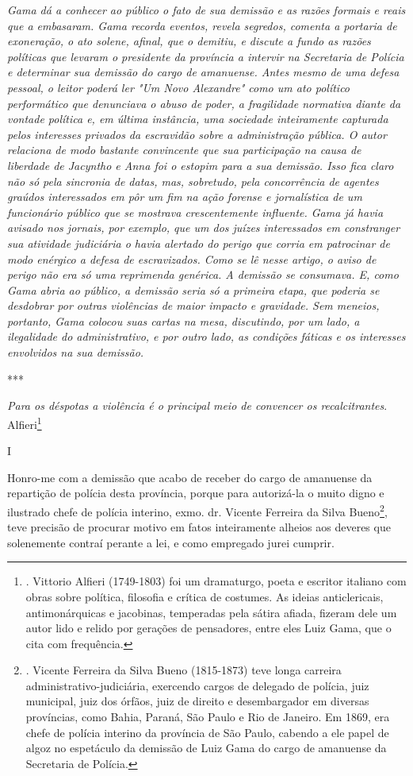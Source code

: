 \emph{Gama dá a conhecer ao público o fato de sua demissão e as razões
formais e reais que a embasaram. Gama recorda eventos, revela segredos,
comenta a portaria de exoneração, o ato solene, afinal, que o demitiu, e
discute a fundo as razões políticas que levaram o presidente da
província a intervir na Secretaria de Polícia e determinar sua demissão
do cargo de amanuense. Antes mesmo de uma defesa pessoal, o leitor
poderá ler "Um Novo Alexandre" como um ato político performático que
denunciava o abuso de poder, a fragilidade normativa diante da vontade
política e, em última instância, uma sociedade inteiramente capturada
pelos interesses privados da escravidão sobre a administração pública. O
autor relaciona de modo bastante convincente que sua participação na
causa de liberdade de Jacyntho e Anna foi o estopim para a sua demissão.
Isso fica claro não só pela sincronia de datas, mas, sobretudo, pela
concorrência de agentes graúdos interessados em pôr um fim na ação
forense e jornalística de um funcionário público que se mostrava
crescentemente influente. Gama já havia avisado nos jornais, por
exemplo, que um dos juízes interessados em constranger sua atividade
judiciária o havia alertado do perigo que corria em patrocinar de modo
enérgico a defesa de escravizados. Como se lê nesse artigo, o aviso de
perigo não era só uma reprimenda genérica. A demissão se consumava. E,
como Gama abria ao público, a demissão seria só a primeira etapa, que
poderia se desdobrar por outras violências de maior impacto e gravidade.
Sem meneios, portanto, Gama colocou suas cartas na mesa, discutindo, por
um lado, a ilegalidade do administrativo, e por outro lado, as condições
fáticas e os interesses envolvidos na sua demissão. }

***

\emph{Para os déspotas a violência é o principal meio de convencer os
recalcitrantes}. Alfieri\footnote{. Vittorio Alfieri (1749-1803) foi um
  dramaturgo, poeta e escritor italiano com obras sobre política,
  filosofia e crítica de costumes. As ideias anticlericais,
  antimonárquicas e jacobinas, temperadas pela sátira afiada, fizeram
  dele um autor lido e relido por gerações de pensadores, entre eles
  Luiz Gama, que o cita com frequência.}

I

Honro-me com a demissão que acabo de receber do cargo de amanuense da
repartição de polícia desta província, porque para autorizá-la o muito
digno e ilustrado chefe de polícia interino, exmo. dr. Vicente Ferreira
da Silva Bueno\footnote{. Vicente Ferreira da Silva Bueno (1815-1873)
  teve longa carreira administrativo-judiciária, exercendo cargos de
  delegado de polícia, juiz municipal, juiz dos órfãos, juiz de direito
  e desembargador em diversas províncias, como Bahia, Paraná, São Paulo
  e Rio de Janeiro. Em 1869, era chefe de polícia interino da província
  de São Paulo, cabendo a ele papel de algoz no espetáculo da demissão
  de Luiz Gama do cargo de amanuense da Secretaria de Polícia.}, teve
precisão de procurar motivo em fatos inteiramente alheios aos deveres
que solenemente contraí perante a lei, e como empregado jurei cumprir.

